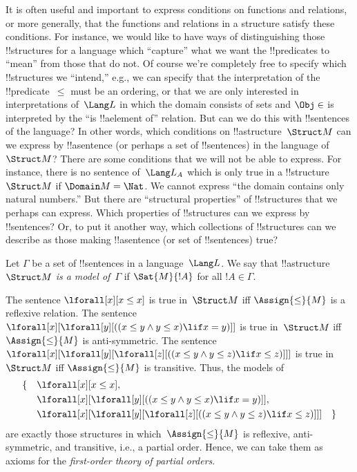 \begin{explain}
It is often useful and important to express conditions on
functions and relations, or more generally, that the functions and
relations in a structure satisfy these conditions.  For instance, we
would like to have ways of distinguishing those !!{structure}s for a
language which ``capture'' what we want the !!{predicate}s to ``mean''
from those that do not.  Of course we're completely free to specify
which !!{structure}s we ``intend,'' e.g., we can specify that the
interpretation of the !!{predicate}~$\le$ must be an ordering, or that
we are only interested in interpretations of~$\Lang L$ in which the
domain consists of sets and $\Obj \in$ is interpreted by the ``is
!!a{element} of'' relation.  But can we do this with !!{sentence}s of
the language?  In other words, which conditions on
!!a{structure}~$\Struct M$ can we express by !!a{sentence} (or perhaps
a set of !!{sentence}s) in the language of~$\Struct M$?  There are
some conditions that we will not be able to express.  For instance,
there is no sentence of~$\Lang L_A$ which is only true in a
!!{structure}~$\Struct M$ if $\Domain M = \Nat$.  We cannot express
``the domain contains only natural numbers.''  But there are
``structural properties'' of !!{structure}s that we perhaps can
express.  Which properties of !!{structure}s can we express by
!!{sentence}s?  Or, to put it another way, which collections of
!!{structure}s can we describe as those making !!a{sentence} (or set
of !!{sentence}s) true?
\end{explain}

\begin{defn}
Let $\Gamma$ be a set of !!{sentence}s in a language~$\Lang L$.  We
say that !!a{structure}~$\Struct M$ \emph{is a model of}~$\Gamma$ if
$\Sat{M}{!A}$ for all $!A \in \Gamma$.
\end{defn}

\begin{ex}
The sentence $\lforall[x][x \le x]$ is true in~$\Struct M$ iff
$\Assign{\le}{M}$ is a reflexive relation.  The sentence
$\lforall[x][\lforall[y][((x \le y \land y \le x) \lif x = y)]]$ is
true in~$\Struct M$ iff $\Assign{\le}{M}$ is anti-symmetric.  The
sentence $\lforall[x][\lforall[y][\lforall[z][((x \le y \land y \le z)
      \lif x \le z)]]]$ is true in~$\Struct M$ iff $\Assign{\le}{M}$
is transitive.  Thus, the models of
\begin{align*}
\{\quad &\lforall[x][x \le x], \\
   & \lforall[x][\lforall[y][((x \le y \land y \le
    x) \lif x = y)]], \\
   &\lforall[x][\lforall[y][\lforall[z][((x \le y
      \land y \le z) \lif x \le z)]]] \quad \}
\end{align*}
are exactly those structures in which~$\Assign{\le}{M}$ is reflexive,
anti-symmetric, and transitive, i.e., a partial order.  Hence, we can take
them as axioms for the \emph{first-order theory of partial orders}.
\end{ex}





